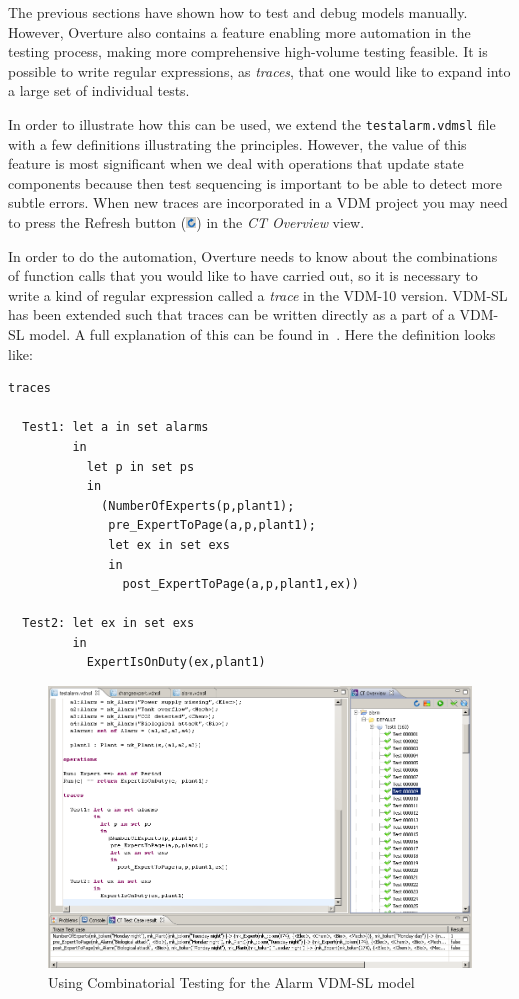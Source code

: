 The previous sections have shown how to test and debug models
manually. However, Overture also contains a feature enabling more
automation in the testing process, making more comprehensive
high-volume testing feasible. It is possible to write regular
expressions, as \emph{traces}, that one would like to expand into a
large set of individual tests.

In order to illustrate how this can be used, we extend the
\texttt{testalarm.vdmsl} file with a few definitions illustrating the
principles. However, the value of this feature is most significant
when we deal with operations that update state components because then
test sequencing is important to be able to detect more subtle
errors. When new traces are incorporated in a VDM project you may need
to press the \textsf{Refresh} button
(\includegraphics[width=0.02\textwidth]{figures/refresh}) in the
\emph{CT Overview} view. 

In order to do the automation, Overture needs to know about the
combinations of function calls that you would like to have carried
out, so it is necessary to write a kind of regular expression called a
\emph{trace} in the VDM-10 version. VDM-SL has been extended such that
traces can be written directly as a part of a VDM-SL model. A full
explanation of this can be found in~\cite{Larsen&09d}. Here the
definition looks like:

\begin{lstlisting}
traces

  Test1: let a in set alarms
         in
           let p in set ps 
           in
             (NumberOfExperts(p,plant1);
              pre_ExpertToPage(a,p,plant1);
              let ex in set exs
              in
                post_ExpertToPage(a,p,plant1,ex))
               
  Test2: let ex in set exs
         in
           ExpertIsOnDuty(ex,plant1)
\end{lstlisting}

\begin{figure}[htbp]
\begin{center}
\includegraphics[width=5.5in]{figures/tracesalarm}
\caption{Using Combinatorial Testing for the Alarm VDM-SL model\label{fig:stracesalarm}}
\end{center}
\end{figure}

